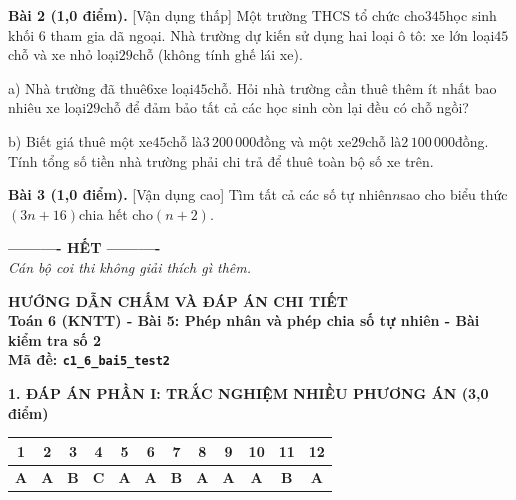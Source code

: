 \documentclass[11pt,a4paper]{article}
\begin{document}
\noindent\textbf{Bài 2 (1,0 điểm).} [Vận dụng thấp] Một trường THCS tổ chức cho$345$học sinh khối 6 tham gia dã ngoại. Nhà trường dự kiến sử dụng hai loại ô tô: xe lớn loại$45$chỗ và xe nhỏ loại$29$chỗ (không tính ghế lái xe).\par\noindent a) Nhà trường đã thuê$6$xe loại$45$chỗ. Hỏi nhà trường cần thuê thêm ít nhất bao nhiêu xe loại$29$chỗ để đảm bảo tất cả các học sinh còn lại đều có chỗ ngồi?\par\noindent b) Biết giá thuê một xe$45$chỗ là$3\,200\,000$đồng và một xe$29$chỗ là$2\,100\,000$đồng. Tính tổng số tiền nhà trường phải chi trả để thuê toàn bộ số xe trên.\par\vspace{8pt}

\noindent\textbf{Bài 3 (1,0 điểm).} [Vận dụng cao] Tìm tất cả các số tự nhiên$n$sao cho biểu thức$(3n + 16)$chia hết cho$(n + 2)$.\par\vspace{8pt}


\begin{center}
\textbf{---------- HẾT ----------}\\
\textit{\small Cán bộ coi thi không giải thích gì thêm.}
\end{center}

\newpage
\begin{center}
{\Large\bfseries HƯỚNG DẪN CHẤM VÀ ĐÁP ÁN CHI TIẾT}\\[4pt]
{\large\bfseries Toán 6 (KNTT) - Bài 5: Phép nhân và phép chia số tự nhiên - Bài kiểm tra số 2}\\[2pt]
{\bfseries Mã đề: \texttt{c1\_6\_bai5\_test2}}
\end{center}

\vspace{10pt}
\noindent\textbf{\large 1. ĐÁP ÁN PHẦN I: TRẮC NGHIỆM NHIỀU PHƯƠNG ÁN (3,0 điểm)}
\vspace{4pt}
\begin{center}
\begin{tabular}{|c|c|c|c|c|c|c|c|c|c|c|c|}
\hline
\textbf{1} & \textbf{2} & \textbf{3} & \textbf{4} & \textbf{5} & \textbf{6} & \textbf{7} & \textbf{8} & \textbf{9} & \textbf{10} & \textbf{11} & \textbf{12} \\
\hline
\textbf{A} & \textbf{A} & \textbf{B} & \textbf{C} & \textbf{A} & \textbf{A} & \textbf{B} & \textbf{A} & \textbf{A} & \textbf{A} & \textbf{B} & \textbf{A} \\
\hline
\end{tabular}
\end{center}
\vspace{6pt}
\end{document}
